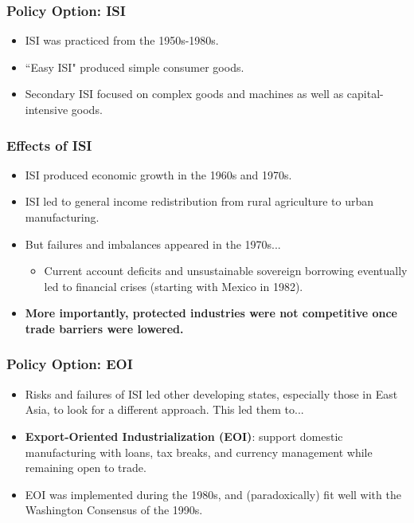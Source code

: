 \documentclass[handout]{beamer}
\begin{document}
\begin{frame} 
	\frametitle{\LARGE{Policy Option: ISI}}
	\begin{itemize}
		\item ISI was practiced from the 1950s-1980s. \pause
		\item ``Easy ISI" produced simple consumer goods.
		\item Secondary ISI focused on complex goods and machines as well as capital-intensive goods. \pause
		
	\end{itemize}
\end{frame}

\begin{frame} 
	\frametitle{\LARGE{Effects of ISI}}
	\begin{itemize}
		\item ISI produced economic growth in the 1960s and 1970s. \pause
		\item ISI led to general income redistribution from rural agriculture to urban manufacturing. \pause
		\item But failures and imbalances appeared in the 1970s... \pause
		\begin{itemize}
			\item Current account deficits and unsustainable sovereign borrowing eventually led to financial crises (starting with Mexico in 1982).
		\end{itemize}
		\item \textbf{More importantly, protected industries were not competitive once trade barriers were lowered.}
	\end{itemize}
\end{frame}


\begin{frame} 
	\frametitle{\LARGE{Policy Option: EOI}}
	\begin{itemize}
			\item Risks and failures of ISI led other developing states, especially those in East Asia, to look for a different approach. This led them to...
			\item \textbf{Export-Oriented Industrialization (EOI)}: support domestic manufacturing with loans, tax breaks, and currency management while remaining open to trade.  \pause 
			\item EOI was implemented during the 1980s, and (paradoxically) fit well with the Washington Consensus of the 1990s.
	\end{itemize}
\end{frame}
\end{document}
